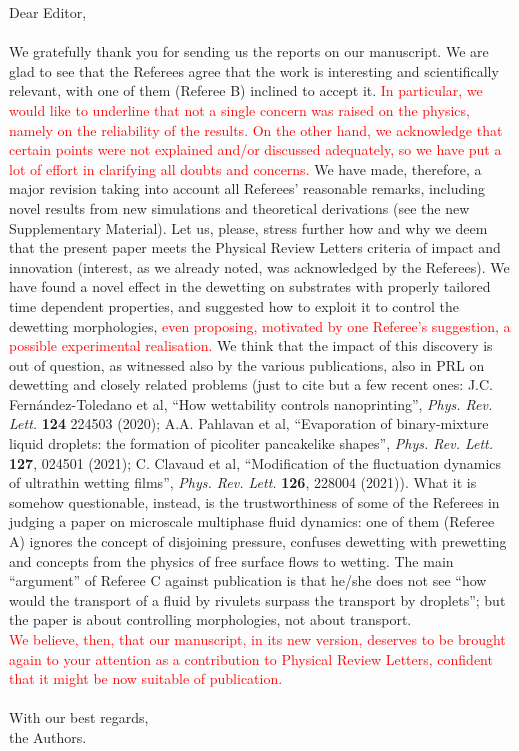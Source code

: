 \documentclass[12pt,english]{article}
\begin{document}
\noindent Dear Editor,\\
\\
\noindent We gratefully thank you for sending us the reports on our manuscript. We are glad to see 
that the Referees agree that the work is interesting and scientifically relevant, with one of them 
(Referee B) inclined to accept it. 
\textcolor{red}{In particular, we would like to underline that not a single 
concern was raised on the physics, namely on the reliability of the results.
On the other hand, we acknowledge that certain points were not explained and/or discussed adequately, so we have put a lot of effort in clarifying all
doubts and concerns.}
We have made, therefore, a major revision taking into account all Referees' reasonable remarks, including novel 
results from new simulations and theoretical derivations (see the new Supplementary Material).
Let us, please, stress further how and why we deem that the present paper meets the Physical
Review Letters criteria of impact and innovation (interest, as we already noted, was acknowledged by the Referees).
We have found a novel effect in the dewetting on substrates with properly tailored time dependent properties, and 
suggested how to exploit it to control the dewetting morphologies, 
\textcolor{red}{even proposing, motivated by one Referee's suggestion, a possible experimental realisation.}
We think that the impact of this discovery is out of question, as witnessed also by the various publications, also in PRL on dewetting and closely related problems
(just to cite but a few recent ones: J.C. Fern\'andez-Toledano et al, ``How wettability controls nanoprinting'',
{\it Phys. Rev. Lett.} {\bf 124} 224503 (2020); A.A. Pahlavan et al,
``Evaporation of binary-mixture liquid droplets: the formation of picoliter pancakelike shapes'', {\it Phys. Rev. Lett.} {\bf 127}, 024501 (2021); 
C. Clavaud et al, ``Modification of the fluctuation dynamics of ultrathin wetting films'', {\it Phys. Rev. Lett.} {\bf 126}, 228004 (2021)).
What it is somehow questionable, instead, is the trustworthiness of some of the Referees in judging a paper on microscale multiphase fluid dynamics: one of 
them (Referee A) ignores the concept of disjoining pressure, confuses dewetting with prewetting and concepts from the physics of free surface flows to wetting.
The main ``argument'' of Referee C against publication is that he/she does not see ``how would the transport of a fluid by rivulets 
surpass the transport by droplets''; but the paper is about controlling morphologies, not about transport.\\
\textcolor{red}{We believe, then, that our manuscript, in its new version, deserves to be brought again to your attention as a contribution to Physical Review Letters, 
confident that it might be now suitable of publication.}\\
\\
With our best regards,\\
the Authors.
\end{document}
